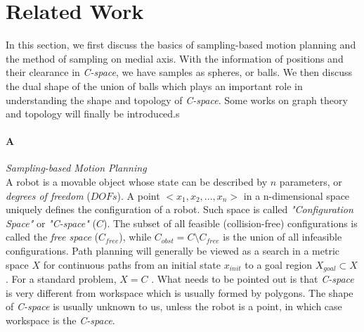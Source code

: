 \documentclass[11pt]{article}
\begin{document}


%

\section{Related Work}\label{related work}

\indent\indent In this section, we first discuss the basics of sampling-based motion planning and the method of sampling on medial axis. With the information of positions and their clearance in \emph{C-space}, we have samples as spheres, or balls. We then discuss the dual shape of the union of balls which plays an important role in understanding the shape and topology of \emph{C-space}. Some works on graph theory and topology will finally be introduced.s


\paragraph{A} \emph{Sampling-based Motion Planning} \hfill \\
\indent A robot is a movable object whose state can be described by $n$ parameters, or \emph{degrees of freedom} ($DOFs$). A point $<x_1, x_2, ..., x_n>$ in a n-dimensional space uniquely defines the configuration of a robot. Such space is called \emph{"Configuration Space"} or \emph{"C-space"}  ($C$). The subset of all feasible (collision-free) configurations is called the \emph{free space} (\emph{$C_{free}$}), while $C_{obst} = C \setminus C_{free}$ is the union of all infeasible configurations\cite{UMAPRM}. Path planning will generally be viewed as a search in a metric space $X$ for continuous paths from an initial state $x_{init}$ to a goal region $X_{goal} \subset X$. For a standard problem, $X = C$ \cite{RRT}. What needs to be pointed out is that \emph{C-space} is very different from workspace which is usually formed by polygons. The shape of \emph{C-space} is usually unknown to us, unless the robot is a point, in which case workspace is the \emph{C-space}. 
\end{document}
